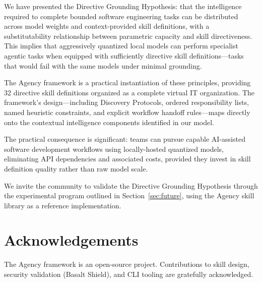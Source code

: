 \documentclass[11pt,a4paper]{article}
\begin{document}
We have presented the Directive Grounding Hypothesis: that the intelligence
required to complete bounded software engineering tasks can be distributed
across model weights and context-provided skill definitions, with a
substitutability relationship between parametric capacity and skill
directiveness. This implies that aggressively quantized local models can
perform specialist agentic tasks when equipped with sufficiently directive
skill definitions—tasks that would fail with the same models under
minimal grounding.

The Agency framework is a practical instantiation of these principles,
providing 32 directive skill definitions organized as a complete virtual IT
organization. The framework's design—including Discovery Protocols, ordered
responsibility lists, named heuristic constraints, and explicit workflow
handoff rules—maps directly onto the contextual intelligence components
identified in our model.

The practical consequence is significant: teams can pursue capable AI-assisted
software development workflows using locally-hosted quantized models,
eliminating API dependencies and associated costs, provided they invest in
skill definition quality rather than raw model scale.

We invite the community to validate the Directive Grounding Hypothesis
through the experimental program outlined in Section~\ref{sec:future},
using the Agency skill library as a reference implementation.

\section*{Acknowledgements}
The Agency framework is an open-source project. Contributions to skill
design, security validation (Basalt Shield), and CLI tooling are gratefully
acknowledged.



\end{document}
